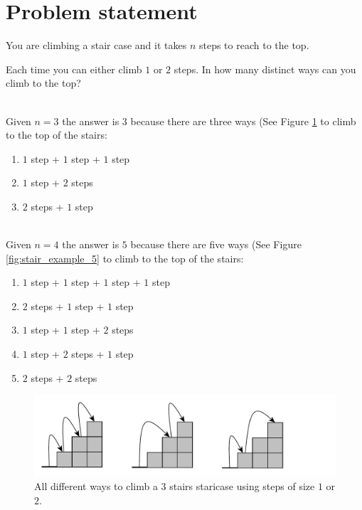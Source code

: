 \section{Problem statement}
\label{sec:stairs_climbing_statement_easy}
\begin{exercise}
You are climbing a stair case and it takes $n$ steps to reach to the top.

Each time you can either climb $1$ or $2$ steps. In how many distinct ways can you climb to the top?


\begin{example}
	\hfill \\ 
	Given $n = 3$ the answer is $3$ because there are three ways (See Figure \ref{fig:stair_example_3} to climb to the top of the stairs:
	\begin{enumerate}
		\item $1$ step + $1$ step + $1$ step
		\item $1$ step + $2$ steps
		\item $2$ steps + $1$ step
	\end{enumerate}
	

	
\end{example}

\begin{example}
	\hfill \\
	Given $n = 4$ the answer is $5$ because there are five ways (See Figure \ref{fig:stair_example_5} to climb to the top of the stairs:
	\begin{enumerate}
		\item $1$ step + $1$ step + $1$ step + $1$ step
		\item $2$ steps + $1$ step + $1$ step
		\item $1$ step + $1$ step + $2$ steps 
		\item $1$ step + $2$ steps + $1$ step
		\item $2$ steps +  $2$ steps
	\end{enumerate}
	
	
\end{example}
\end{exercise}

\begin{figure}
	\centering
	\includegraphics[width=\textwidth]{sources/stairs_climbing/images/stairs3}
	\caption{All different ways to climb a 3 stairs staricase using steps of size $1$ or $2$.}
	\label{fig:stair_example_3}
\end{figure}

